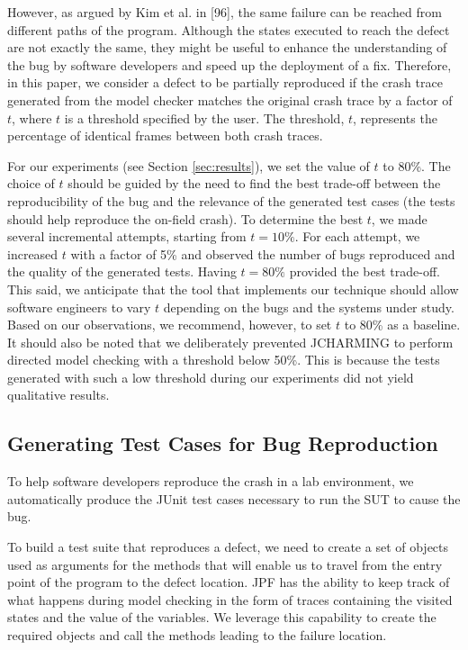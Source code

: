 \documentclass[12pt]{report}
\begin{document}
However, as argued by Kim et al. in {[}96{]}, the same failure can be
reached from different paths of the program. Although the states
executed to reach the defect are not exactly the same, they might be
useful to enhance the understanding of the bug by software developers
and speed up the deployment of a fix. Therefore, in this paper, we
consider a defect to be partially reproduced if the crash trace
generated from the model checker matches the original crash trace by a
factor of \(t\), where \(t\) is a threshold specified by the user. The
threshold, \(t\), represents the percentage of identical frames between
both crash traces.

For our experiments (see Section \ref{sec:results}), we set the value of
\(t\) to 80\%. The choice of \(t\) should be guided by the need to find
the best trade-off between the reproducibility of the bug and the
relevance of the generated test cases (the tests should help reproduce
the on-field crash). To determine the best \(t\), we made several
incremental attempts, starting from \(t = 10\%\). For each attempt, we
increased \(t\) with a factor of 5\% and observed the number of bugs
reproduced and the quality of the generated tests. Having \(t = 80\%\)
provided the best trade-off. This said, we anticipate that the tool that
implements our technique should allow software engineers to vary \(t\)
depending on the bugs and the systems under study. Based on our
observations, we recommend, however, to set \(t\) to 80\% as a baseline.
It should also be noted that we deliberately prevented JCHARMING to
perform directed model checking with a threshold below 50\%. This is
because the tests generated with such a low threshold during our
experiments did not yield qualitative results.

\subsection{\texorpdfstring{Generating Test Cases for Bug
Reproduction\label{sec:unit-tests}}{Generating Test Cases for Bug Reproduction}}\label{generating-test-cases-for-bug-reproduction}

To help software developers reproduce the crash in a lab environment, we
automatically produce the JUnit test cases necessary to run the SUT to
cause the bug.

To build a test suite that reproduces a defect, we need to create a set
of objects used as arguments for the methods that will enable us to
travel from the entry point of the program to the defect location. JPF
has the ability to keep track of what happens during model checking in
the form of traces containing the visited states and the value of the
variables. We leverage this capability to create the required objects
and call the methods leading to the failure location.
\end{document}
